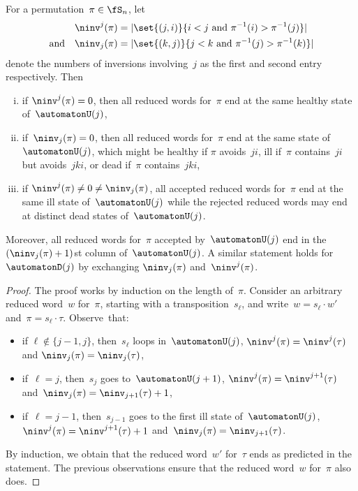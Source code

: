 \begin{proposition}\label{prop:sameStateAcceptedReducedExpressionsRefined}
For a permutation~$\pi \in \fS_n$, let
\begin{align*}
\ninv^j(\pi) &= |\set{(j,i)}{i < j  \text{ and }  \pi^{-1}(i) > \pi^{-1}(j)}| \\
\text{and} \quad
\ninv_j(\pi) &= |\set{(k,j)}{j < k \text{ and } \pi^{-1}(j) > \pi^{-1}(k)}|
\end{align*}
denote the numbers of inversions involving~$j$ as the first and second entry respectively. Then
\begin{enumerate}[(i)]
	\item if $\ninv^j(\pi) = 0$, then all reduced words for~$\pi$ end at the same healthy state of~$\automatonU(j)$,
	\item if~$\ninv_j(\pi) = 0$, then all reduced words for~$\pi$ end at the same state of~$\automatonU(j)$, which might be healthy if $\pi$ avoids~$ji$, ill if~$\pi$ contains~$ji$ but avoids~$jki$, or dead if~$\pi$ contains~$jki$,
	\item if $\ninv^j(\pi) \ne 0 \ne \ninv_j(\pi)$, all accepted reduced words for~$\pi$ end at the same ill state of~$\automatonU(j)$ while the rejected reduced words may end at distinct dead states of~$\automatonU(j)$.
\end{enumerate}
Moreover, all reduced words for~$\pi$ accepted by~$\automatonU(j)$ end in the $(\ninv_j(\pi)+1)$st column of~$\automatonU(j)$.
A similar statement holds for~$\automatonD(j)$ by exchanging $\ninv_j(\pi)$ and~$\ninv^j(\pi)$.
\end{proposition}

\begin{proof}
The proof works by induction on the length of~$\pi$.
Consider an arbitrary reduced word~$w$ for~$\pi$, starting with a transposition~$s_\ell$, and write~$w = s_\ell \cdot w'$ and~$\pi = s_\ell \cdot \tau$.
Observe~that:
\begin{itemize}
	\item if $\ell \notin \{j-1, j\}$, then~$s_\ell$ loops in~$\automatonU(j)$, $\ninv^j(\pi) = \ninv^j(\tau)$ and $\ninv_j(\pi) = \ninv_j(\tau)$,
	\item if~$\ell = j$, then~$s_j$ goes to~$\automatonU(j+1)$, $\ninv^j(\pi) = \ninv^{j+1}(\tau)$ and~$\ninv_j(\pi) = \ninv_{j+1}(\tau) + 1$,
	\item if~$\ell = j-1$, then~$s_{j-1}$ goes to the first ill state of~$\automatonU(j)$, $\ninv^j(\pi) = {\ninv^{j+1}(\tau) + 1}$ and~$\ninv_j(\pi) = \ninv_{j+1}(\tau)$.
\end{itemize}
By induction, we obtain that the reduced word~$w'$ for~$\tau$ ends as predicted in the statement.
The previous observations ensure that the reduced word~$w$ for~$\pi$ also does.
\end{proof}

